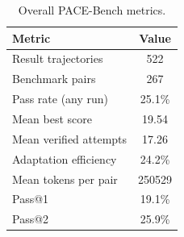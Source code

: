 \begin{table}[t]
    \centering
    \caption{Overall PACE-Bench metrics.}
    \label{tab:pace_overall_metrics}
    \begin{tabular}{lc}
        \toprule
        \textbf{Metric} & \textbf{Value} \\
        \midrule
        Result trajectories & 522 \\
        Benchmark pairs & 267 \\
        Pass rate (any run) & 25.1\% \\
        Mean best score & 19.54 \\
        Mean verified attempts & 17.26 \\
        Adaptation efficiency & 24.2\% \\
        Mean tokens per pair & 250529 \\
        Pass@1 & 19.1\% \\
        Pass@2 & 25.9\% \\
        \bottomrule
    \end{tabular}
\end{table}
